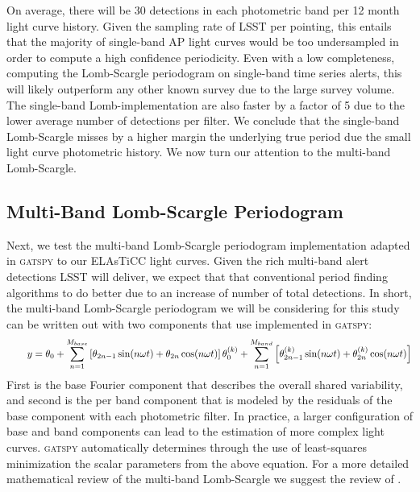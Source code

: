 \documentclass[DM,authoryear,toc]{lsstdoc}
\begin{document}
On average, there will be 30 detections in each photometric band per 12 month light curve history.
Given the sampling rate of LSST per pointing, this entails that the majority of single-band AP light curves would be too undersampled in order to compute a high confidence periodicity.
Even with a low completeness, computing the Lomb-Scargle periodogram on single-band time series alerts, this will likely outperform any other known survey due to the large survey volume.
The single-band Lomb-implementation are also faster by a factor of 5 due to the lower average number of detections per filter.
We conclude that the single-band Lomb-Scargle misses by a higher margin the underlying true period due the small light curve photometric history.
We now turn our attention to the multi-band Lomb-Scargle.

\subsection{Multi-Band Lomb-Scargle Periodogram}
Next, we test the multi-band Lomb-Scargle periodogram implementation adapted in \textsc{gatspy} to our ELAsTiCC light curves.
Given the rich multi-band alert detections LSST will deliver, we expect that that conventional period finding algorithms to do better due to an increase of number of total detections.
In short, the multi-band Lomb-Scargle periodogram we will be considering for this study can be written out with two components that use implemented in \textsc{gatspy}:
\smallbreak{}
\begin{equation}
\qquad y = \theta_0+\sum_{n=1}^{M_{base}}\left[\theta_{2 n-1} \sin (n \omega t)+\theta_{2 n} \cos (n \omega t)\right] \\
\theta_0^{(k)}+\sum_{n=1}^{M _{band}}\left[\theta_{2 n-1}^{(k)} \sin (n \omega t)+\theta_{2 n}^{(k)} \cos (n \omega t)\right]
\end{equation}
\smallbreak{}
First is the base Fourier component that describes the overall shared variability, and second is the per band component that is modeled by the residuals of the base component with each photometric filter.
In practice, a larger configuration of base and band components can lead to the estimation of more complex light curves.
\textsc{gatspy} automatically determines through the use of least-squares minimization the scalar parameters from the above equation.
For a more detailed mathematical review of the multi-band Lomb-Scargle we suggest the review of \citet{VanderPlas:VP2015}.
\end{document}
